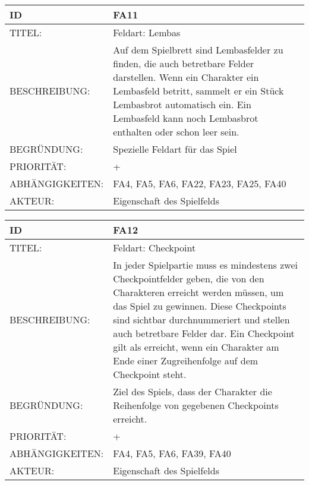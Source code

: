 \documentclass{uulm-assignment}
\begin{document}
    \begin{tabularx}{\textwidth}{|l|X |} \hline
        \textbf{ID} & \textbf{FA11} \\
        \hline
        TITEL: &  Feldart: Lembas\\
        \hline
        BESCHREIBUNG: & Auf dem Spielbrett sind Lembasfelder zu finden, die auch betretbare Felder darstellen. Wenn ein Charakter ein Lembasfeld betritt, sammelt er ein Stück
Lembasbrot automatisch ein. Ein Lembasfeld kann noch Lembasbrot enthalten
oder schon leer sein.
        \\
        \hline
        BEGRÜNDUNG: & Spezielle Feldart für das Spiel \\
        \hline
        PRIORITÄT: & +\\
        \hline
        ABHÄNGIGKEITEN: & FA4, FA5, FA6, FA22, FA23, FA25, FA40\\
        \hline
        AKTEUR: & Eigenschaft des Spielfelds\\
        \hline
    \end{tabularx}
    
    \begin{tabularx}{\textwidth}{|l|X |} \hline
        \textbf{ID} & \textbf{FA12} \\
        \hline
        TITEL: &  Feldart: Checkpoint\\
        \hline
        BESCHREIBUNG: & In jeder Spielpartie muss es mindestens zwei Checkpointfelder geben, die von den Charakteren erreicht werden müssen, um das Spiel zu gewinnen. Diese
Checkpoints sind sichtbar durchnummeriert und stellen auch betretbare Felder dar.
Ein Checkpoint gilt als erreicht, wenn ein Charakter am Ende einer Zugreihenfolge
auf dem Checkpoint steht.
        \\
        \hline
        BEGRÜNDUNG: & Ziel des Spiels, dass der Charakter die Reihenfolge von gegebenen Checkpoints erreicht.
        \\
        \hline
        PRIORITÄT: & +\\
        \hline
        ABHÄNGIGKEITEN: & FA4, FA5, FA6, FA39, FA40\\
        \hline
        AKTEUR: & Eigenschaft des Spielfelds \\
        \hline
    \end{tabularx}
    
\end{document}
